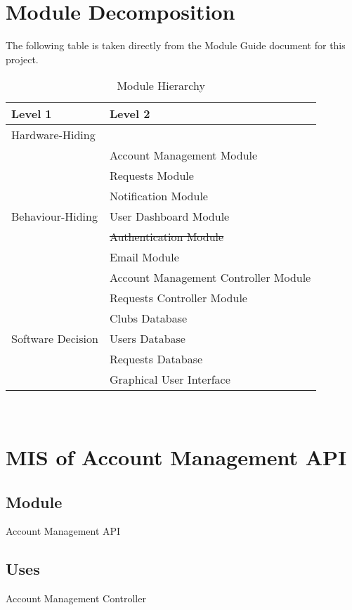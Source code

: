 \documentclass[12pt, titlepage]{article}
\begin{document}
\section{Module Decomposition}

The following table is taken directly from the Module Guide document for this project.

\begin{table}[h!]
\centering
\begin{tabular}{p{} p{}}
\toprule
\textbf{Level 1} & \textbf{Level 2}\\
\midrule

{Hardware-Hiding} & ~ \\
\midrule

\multirow{7}{0.3\textwidth}{Behaviour-Hiding} 
& Account Management Module\\
& Requests Module\\
& Notification Module\\
& User Dashboard Module\\
& \st{Authentication Module}\\ 
& Email Module\\
& Account Management Controller Module\\
& Requests Controller Module\\
\midrule

\multirow{3}{0.3\textwidth}{Software Decision} 
& Clubs Database\\
& Users Database\\
& Requests Database\\
& Graphical User Interface\\
\bottomrule

\end{tabular}
\caption{Module Hierarchy}
\label{TblMH}
\end{table}

\newpage
~\newpage

\section{MIS of Account Management API} \label{AccountManagementAPI}

\subsection{Module}
Account Management API

\subsection{Uses}
Account Management Controller
\end{document}
